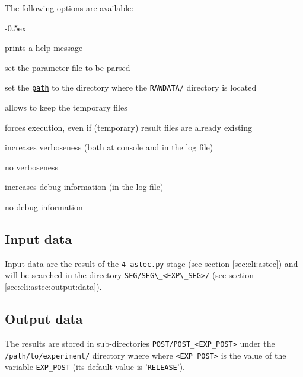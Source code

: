 The following options are available:
\begin{description}
  \itemsep -0.5ex
\item[\texttt{-h}] prints a help message
\item[\texttt{-p \underline{file}}] set the parameter file to be parsed
\item[\texttt{-e \underline{path}}] set the
  \texttt{\underline{path}} to the directory where the
  \texttt{RAWDATA/} directory is located
\item[\texttt{-k}] allows to keep the temporary files
\item[\texttt{-f}] forces execution, even if (temporary) result files
  are already existing
\item[\texttt{-v}] increases verboseness (both at console and in the
  log file)
\item[\texttt{-nv}] no verboseness
\item[\texttt{-d}]  increases debug information (in the
  log file)
\item[\texttt{-nd}] no debug information
\end{description}

\subsection{Input data}
\label{sec:cli:post:correction:input:data}
Input data are the result of the \verb|4-astec.py| stage (see section \ref{sec:cli:astec}) and will be searched in the directory \verb|SEG/SEG\_<EXP\_SEG>/| (see section \ref{sec:cli:astec:output:data}).



\subsection{Output data}

The results are stored in sub-directories
\texttt{POST/POST\_<EXP\_POST>} under the
\texttt{/path/to/experiment/} directory where where \texttt{<EXP\_POST>} is the value of the variable \texttt{EXP\_POST} (its
default value is '\texttt{RELEASE}'). 


